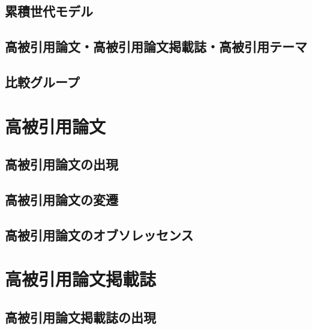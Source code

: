 \documentclass[12pt,a4paper,twocolumn,twoside]{ujsikpb}
\begin{document}
\subsection{累積世代モデル}



\subsection{高被引用論文・高被引用論文掲載誌・高被引用テーマ}



\subsection{比較グループ}


\section{高被引用論文}
\subsection{高被引用論文の出現}



\subsection{高被引用論文の変遷}





\subsection{高被引用論文のオブソレッセンス}









\section{高被引用論文掲載誌}

\subsection{高被引用論文掲載誌の出現}


\end{document}
